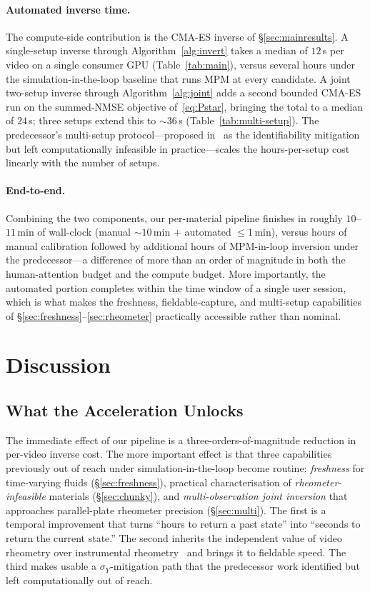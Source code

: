 \paragraph{Automated inverse time.}
The compute-side contribution is the CMA-ES inverse of
\S\ref{sec:mainresults}. A single-setup inverse through
Algorithm~\ref{alg:invert} takes a median of $12$\,s per video on a
single consumer GPU (Table~\ref{tab:main}), versus several hours
under the simulation-in-the-loop baseline that runs MPM at every
candidate. A joint two-setup inverse through
Algorithm~\ref{alg:joint} adds a second bounded CMA-ES run on the
summed-NMSE objective of~\eqref{eq:Pstar}, bringing the total to a
median of $24$\,s; three setups extend this to $\sim\!36$\,s
(Table~\ref{tab:multi-setup}). The predecessor's
multi-setup protocol---proposed
in~\cite{hamamichi2023nonnewtonian} as the identifiability
mitigation but left computationally infeasible in practice---scales
the hours-per-setup cost linearly with the number of setups.

\paragraph{End-to-end.}
Combining the two components, our per-material pipeline finishes in
roughly $10$--$11$\,min of wall-clock (manual $\sim\!10$\,min
$+$ automated $\le 1$\,min), versus hours of manual calibration
followed by additional hours of MPM-in-loop inversion under the
predecessor---a difference of more than an order of magnitude in
both the human-attention budget and the compute budget. More
importantly, the automated portion completes within the time window
of a single user session, which is what makes the freshness,
fieldable-capture, and multi-setup capabilities of
\S\ref{sec:freshness}--\ref{sec:rheometer} practically accessible
rather than nominal.


\section{Discussion}
\label{sec:discussion}

\subsection{What the Acceleration Unlocks}

The immediate effect of our pipeline is a three-orders-of-magnitude
reduction in per-video inverse cost. The more important effect is
that three capabilities previously out of reach under
simulation-in-the-loop become routine:
\emph{freshness} for time-varying
fluids (\S\ref{sec:freshness}),
practical characterisation of \emph{rheometer-infeasible}
materials (\S\ref{sec:chunky}), and
\emph{multi-observation joint inversion} that approaches
parallel-plate rheometer precision (\S\ref{sec:multi}). The first is
a temporal improvement that turns ``hours to return a past state''
into ``seconds to return the current state.'' The second inherits
the independent value of video rheometry over instrumental
rheometry~\cite{hamamichi2023nonnewtonian} and brings it to
fieldable speed. The third makes usable a $\sigma_Y$-mitigation path
that the predecessor work identified but left computationally out of
reach.

